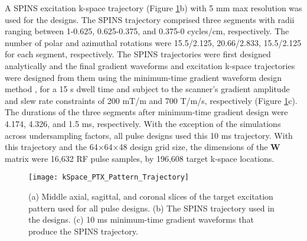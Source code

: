 \par A SPINS excitation k-space trajectory \cite{malik2012tailored} (Figure \ref{fig:Target}b) with 5 mm max resolution was used for the designs. 
The SPINS trajectory comprised three segments with radii ranging between 1-0.625, 0.625-0.375, and 0.375-0 cycles/cm, respectively.
The number of polar and azimuthal rotations were 15.5/2.125, 20.66/2.833, 15.5/2.125 for each segment, respectively.
The SPINS trajectories were first designed analytically and the final gradient waveforms and excitation k-space trajectories were designed from them 
using the minimum-time gradient waveform design method \cite{lustig2008fast}, 
for a 15 {\textmu}s dwell time and subject to the scanner's gradient amplitude and slew rate constraints of 200 mT/m and 700 T/m/s, respectively (Figure \ref{fig:Target}c). 
The durations of the three segments after minimum-time gradient design were 4.174, 4.326, and 1.5 ms, respectively.
With the exception of the simulations across undersampling factors, 
all pulse designs used this 10 ms trajectory.
With this trajectory and the 64$\times$64$\times$48 design grid size, 
the dimensions of the $\bm{W}$ matrix were 16,632 RF pulse samples, by 196,608 target k-space locations. 

\begin{figure}
	\centering
	\texttt{[image: kSpace\_PTX\_Pattern\_Trajectory]}
	\caption{(a) Middle axial, sagittal, and coronal slices of the target excitation pattern used for all pulse designs. 
	(b) The SPINS trajectory used in the designs. 
	(c) 10 ms minimum-time gradient waveforms that produce the SPINS trajectory.}
	\label{fig:Target}
\end{figure}


